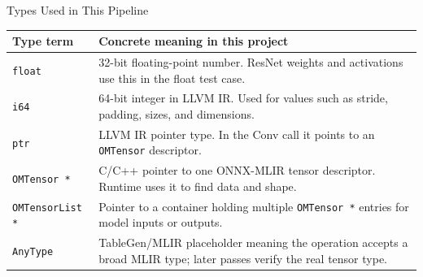 \documentclass[aspectratio=169,10pt]{beamer}
\newcommand{\code}[1]{\texttt{\footnotesize #1}}
\begin{document}
\begin{frame}{Types Used in This Pipeline}
  \scriptsize
  \begin{tabularx}{\textwidth}{@{}lX@{}}
    \toprule
    Type term & Concrete meaning in this project \\
    \midrule
    \code{float} & 32-bit floating-point number. ResNet weights and activations use this in the float test case. \\
    \code{i64} & 64-bit integer in LLVM IR. Used for values such as stride, padding, sizes, and dimensions. \\
    \code{ptr} & LLVM IR pointer type. In the Conv call it points to an \code{OMTensor} descriptor. \\
    \code{OMTensor *} & C/C++ pointer to one ONNX-MLIR tensor descriptor. Runtime uses it to find data and shape. \\
    \code{OMTensorList *} & Pointer to a container holding multiple \code{OMTensor *} entries for model inputs or outputs. \\
    \code{AnyType} & TableGen/MLIR placeholder meaning the operation accepts a broad MLIR type; later passes verify the real tensor type. \\
    \bottomrule
  \end{tabularx}
\end{frame}
\end{document}
